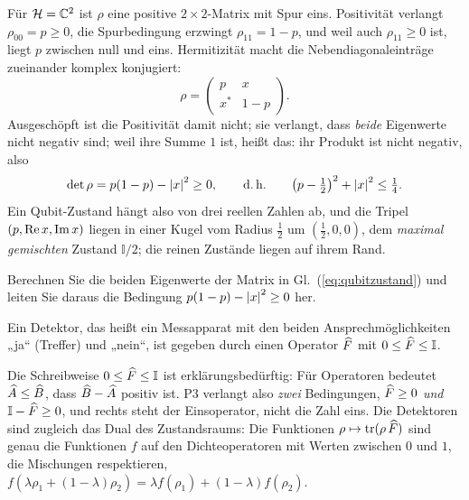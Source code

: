 \begin{beispiel}
Für $\mathcal{H} = \mathbb{C}^2$ ist $\rho$ eine positive $2\times 2$-Matrix mit Spur eins. Positivität verlangt $\rho_{00} = p\geq 0$, die Spurbedingung erzwingt $\rho_{11} = 1-p$, und weil auch $\rho_{11}\geq 0$ ist, liegt $p$ zwischen null und eins. Hermitizität macht die Nebendiagonaleinträge zueinander komplex konjugiert:
\begin{equation}\label{eq:qubitzustand}
	\rho = \begin{pmatrix} p & x \\ x^* & 1-p\end{pmatrix}.
\end{equation}
Ausgeschöpft ist die Positivität damit nicht; sie verlangt, dass \emph{beide} Eigenwerte nicht negativ sind; weil ihre Summe $1$ ist, heißt das: ihr Produkt ist nicht negativ, also
\begin{equation}
	\det\rho = p(1-p) - \left\lvert x \right\rvert^2 \geq 0, \qquad \text{d.\,h.} \qquad \bigl(p-\tfrac12\bigr)^2 + \left\lvert x \right\rvert^2 \leq \tfrac14.
\end{equation}
Ein Qubit-Zustand hängt also von drei reellen Zahlen ab, und die Tripel $(p, \operatorname{Re} x, \operatorname{Im} x)$ liegen in einer Kugel vom Radius $\tfrac12$ um $(\tfrac12, 0, 0)$, dem \emph{maximal gemischten} Zustand $\mathbb{I}/2$; die reinen Zustände liegen auf ihrem Rand.
\end{beispiel}

\begin{übung}
Berechnen Sie die beiden Eigenwerte der Matrix in Gl.~(\ref{eq:qubitzustand}) und leiten Sie daraus die Bedingung $p(1-p) - \left\lvert x \right\rvert^2 \ge 0$ her.
\end{übung}

\begin{merksatz}[P3]
	Ein Detektor, das heißt ein Messapparat mit den beiden Ansprechmöglichkeiten „ja“ (Treffer) und „nein“, ist gegeben durch einen Operator $\widehat{F}$ mit $0 \leq \widehat{F} \leq \mathbb{I}$.
\end{merksatz}
Die Schreibweise $0 \leq \widehat{F} \leq \mathbb{I}$ ist erklärungsbedürftig: Für Operatoren bedeutet $\widehat{A}\leq\widehat{B}$, dass $\widehat{B}-\widehat{A}$ positiv ist. P3 verlangt also \emph{zwei} Bedingungen, $\widehat{F}\geq 0$ \emph{und} $\mathbb{I}-\widehat{F}\geq 0$, und rechts steht der Einsoperator, nicht die Zahl eins. Die Detektoren sind zugleich das Dual des Zustandsraums: Die Funktionen $\rho\mapsto\operatorname{tr}(\rho\,\widehat{F})$ sind genau die Funktionen $f$ auf den Dichteoperatoren mit Werten zwischen $0$ und $1$, die Mischungen respektieren, $f(\lambda\rho_1 + (1-\lambda)\rho_2) = \lambda f(\rho_1) + (1-\lambda)f(\rho_2)$.

